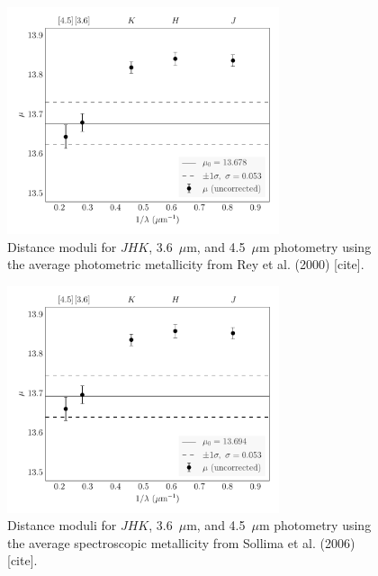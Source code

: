 \documentclass[a4paper,fleqn,usenatbib]{mnras}
\begin{document}
\begin{figure}
\begin{center}
\includegraphics[width=80mm]{final_plots/multiwavelength_distance_samestars_phot.pdf}
\caption{Distance moduli for $J\!H\!K$, 3.6~$\mu$m, and 4.5~$\mu$m photometry using the average photometric metallicity from Rey et al. (2000) [cite].}
\label{fig:omegaCen_dist_phot}
\end{center}
\end{figure}

\begin{figure}
\begin{center}
\includegraphics[width=80mm]{final_plots/multiwavelength_distance_samestars_spect.pdf}
\caption{Distance moduli for $J\!H\!K$, 3.6~$\mu$m, and 4.5~$\mu$m photometry using the average spectroscopic metallicity from Sollima et al. (2006) [cite].}
\label{fig:omegaCen_dist_spect}
\end{center}
\end{figure}
\end{document}
